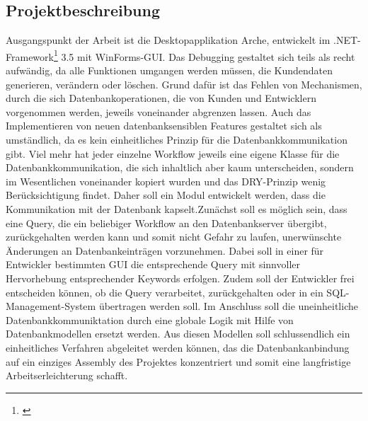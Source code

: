 \documentclass[11pt,toc=sectionentrywithoutdots, 
headheight=44pt, headings=optiontoheadandtoc, hyperfootnotes=false, hypertexnames=false]{scrartcl}
\begin{document}
\subsection{Projektbeschreibung}
Ausgangspunkt der Arbeit ist die Desktopapplikation \glqq Arche\grqq{}, entwickelt im .NET-Framework\footnote{\cite{Microsoft2020}} 3.5 mit WinForms-\acs{GUI}. Das Debugging gestaltet sich teils als recht aufwändig, da alle Funktionen umgangen werden müssen, die Kundendaten generieren, verändern oder löschen. Grund dafür ist das Fehlen von Mechanismen, durch die sich Datenbankoperationen, die von Kunden und Entwicklern vorgenommen werden, jeweils voneinander abgrenzen lassen. Auch das Implementieren von neuen datenbanksensiblen Features gestaltet sich als umständlich, da es kein einheitliches Prinzip für die Datenbankkommunikation gibt. Viel mehr hat jeder einzelne Workflow jeweils eine eigene Klasse für die Datenbankkommunikation, die sich inhaltlich aber kaum unterscheiden, sondern im Wesentlichen voneinander kopiert wurden und das \acs{DRY}-Prinzip wenig Berücksichtigung findet. Daher soll ein Modul entwickelt werden, dass die Kommunikation mit der Datenbank kapselt.\newline\newline Zunächst soll es möglich sein, dass eine \gls{Query}, die ein beliebiger Workflow an den Datenbankserver übergibt, zurückgehalten werden kann und somit nicht Gefahr zu laufen, unerwünschte Änderungen an Datenbankeinträgen vorzunehmen. Dabei soll in einer für Entwickler bestimmten GUI die entsprechende Query mit sinnvoller Hervorhebung entsprechender Keywords erfolgen. Zudem soll der Entwickler frei entscheiden können, ob die Query verarbeitet, zurückgehalten oder in ein \acs{SQL}-Management-System übertragen werden soll. Im Anschluss soll die uneinheitliche Datenbankkommuniktation durch eine globale Logik mit Hilfe von Datenbankmodellen ersetzt werden. Aus diesen Modellen soll schlussendlich ein einheitliches Verfahren abgeleitet werden können, das die Datenbankanbindung auf ein einziges \gls{Assembly} des Projektes konzentriert und somit eine langfristige Arbeitserleichterung schafft.
\end{document}

